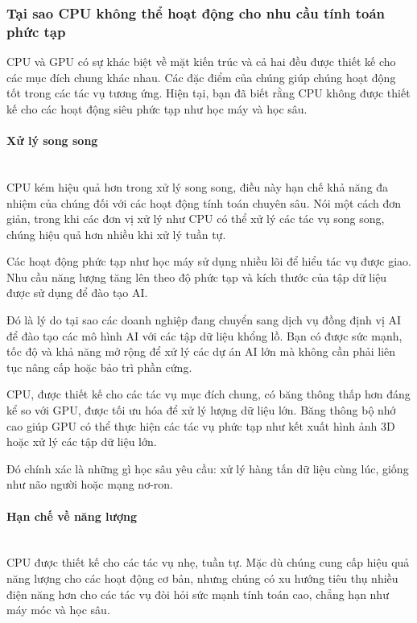\documentclass[a4paper]{article}
\begin{document}
\subsubsection{Tại sao CPU không thể hoạt động cho nhu cầu tính toán phức tạp}
CPU và GPU có sự khác biệt về mặt kiến trúc và cả hai đều được thiết kế cho các mục đích chung khác nhau. Các đặc điểm của chúng giúp chúng hoạt động tốt trong các tác vụ tương ứng. Hiện tại, bạn đã biết rằng CPU không được thiết kế cho các hoạt động siêu phức tạp như học máy và học sâu.
\paragraph{Xử lý song song}\leavevmode\\
CPU kém hiệu quả hơn trong xử lý song song, điều này hạn chế khả năng đa nhiệm của chúng đối với các hoạt động tính toán chuyên sâu. Nói một cách đơn giản, trong khi các đơn vị xử lý như CPU có thể xử lý các tác vụ song song, chúng hiệu quả hơn nhiều khi xử lý tuần tự.

Các hoạt động phức tạp như học máy sử dụng nhiều lõi để hiểu tác vụ được giao. Nhu cầu năng lượng tăng lên theo độ phức tạp và kích thước của tập dữ liệu được sử dụng để đào tạo AI.

Đó là lý do tại sao các doanh nghiệp đang chuyển sang dịch vụ đồng định vị AI để đào tạo các mô hình AI với các tập dữ liệu khổng lồ. Bạn có được sức mạnh, tốc độ và khả năng mở rộng để xử lý các dự án AI lớn mà không cần phải liên tục nâng cấp hoặc bảo trì phần cứng.

CPU, được thiết kế cho các tác vụ mục đích chung, có băng thông thấp hơn đáng kể so với GPU, được tối ưu hóa để xử lý lượng dữ liệu lớn. Băng thông bộ nhớ cao giúp GPU có thể thực hiện các tác vụ phức tạp như kết xuất hình ảnh 3D hoặc xử lý các tập dữ liệu lớn.

Đó chính xác là những gì học sâu yêu cầu: xử lý hàng tấn dữ liệu cùng lúc, giống như não người hoặc mạng nơ-ron.

\paragraph{Hạn chế về năng lượng}\leavevmode\\

CPU được thiết kế cho các tác vụ nhẹ, tuần tự. Mặc dù chúng cung cấp hiệu quả năng lượng cho các hoạt động cơ bản, nhưng chúng có xu hướng tiêu thụ nhiều điện năng hơn cho các tác vụ đòi hỏi sức mạnh tính toán cao, chẳng hạn như máy móc và học sâu.
\end{document}
